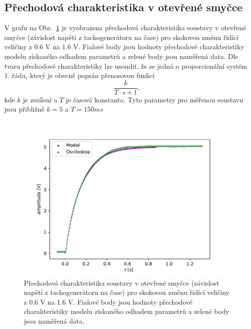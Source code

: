 	\subsection{Přechodová charakteristika v otevřené smyčce}
		V grafu na Obr.~\ref{fig:prechodova} je vyobrazena přechodová charakteristika soustavy v otevřené smyčce (závislost napětí z tachogenerátoru na čase) 
		pro skokovou změnu řídící veličiny z 0.6 V na 1.6 V. Fialové body jsou hodnoty přechodové charakteristiky modelu získaného odhadem parametrů a zelené body jsou naměřená data.
		Dle tvaru přechodové charakteristiky lze usoudit, že se jedná o proporcionální systém 1. řádu, který je obecně popsán přenosovou funkcí
		\begin{equation}
			\frac{k}{T\cdot s + 1},
		\end{equation}
		kde $k$ je zesílení a $T$ je časová konstanta. Tyto parametry pro měřenou soustavu jsou přibližně $k=5$ a $T=150\unit{ms}$

		\begin{figure}[!hbt] %
			\centering
			\includegraphics[]{img/graf_prechodova.pdf} %
			\caption{Přechodová charakteristika soustavy v otevřené smyčce (závislost napětí z tachogenerátoru na čase) 
			pro skokovou změnu řídící veličiny z 0.6 V na 1.6 V. 
			Fialové body jsou hodnoty přechodové charakteristiky modelu získaného odhadem parametrů a zelené body jsou naměřená data.} %
			\label{fig:prechodova} %
		\end{figure}

